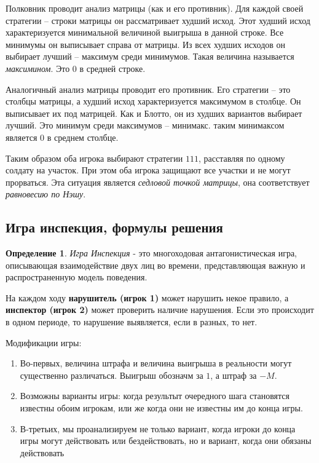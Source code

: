 \documentclass[aps,%
12pt,%
final,%
oneside,
onecolumn,%
musixtex, %
superscriptaddress,%
centertags]{article} %
\theoremstyle{plain}
\theoremstyle{definition}
\newtheorem{definition}{Определение}[subsection]
\theoremstyle{remark}
\begin{document}
Полковник проводит анализ матрицы (как и его противник). Для каждой своей стратегии – строки матрицы он рассматривает худший исход. Этот худший исход характеризуется минимальной величиной выигрыша в данной строке. Все минимумы он выписывает справа от матрицы. Из всех худших исходов он выбирает лучший – максимум среди минимумов. Такая величина называется \textit{максимином}. Это $0$ в средней строке.

Аналогичный анализ матрицы проводит его противник. Его стратегии – это столбцы матрицы, а худший исход характеризуется максимумом в столбце. Он выписывает их под матрицей. Как и Блотто, он из худших вариантов выбирает лучший. Это минимум среди
максимумов – минимакс. таким минимаксом является $0$ в среднем столбце.

Таким образом оба игрока выбирают стратегии $111$, расставляя по одному солдату на
участок. При этом оба игрока защищают все участки и не могут прорваться. Эта ситуация является \textit{седловой точкой матрицы}, она соответствует \textit{равновесию по Нэшу}. 

\newpage
\subsection{Игра инспекция, формулы решения}

\begin{definition}
  \textit{Игра Инспекция} - это многоходовая антагонистическая игра, описывающая взаимодействие двух лиц во времени, представляющая важную и распространенную модель поведения.
\end{definition}

На каждом ходу \textbf{нарушитель (игрок 1)} может нарушить некое правило, а \textbf{инспектор (игрок 2)} может проверить наличие нарушения. Если это происходит в одном периоде, то нарушение выявляется, если в разных, то нет.

Модификации игры:

\begin{enumerate}
  \item Во-первых, величина штрафа и величина выигрыша в реальности могут существенно различаться. Выигрыш обозначм за $1$, а штраф за $-M$.
  \item Возможны варианты игры: когда результыт очередного шага становятся известны обоим игрокам, или же когда они не известны им до конца игры. 
  \item В-третьих, мы проанализируем не только вариант, когда игроки до конца игры могут действовать или бездействовать, но и вариант, когда они обязаны действовать
\end{enumerate}
\end{document}

